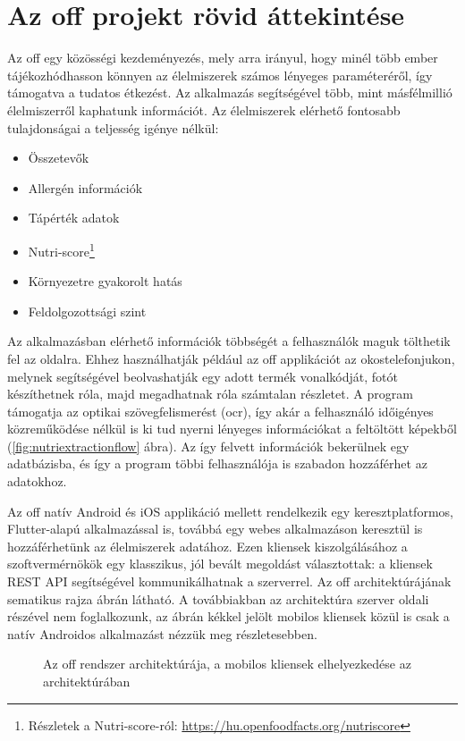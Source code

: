\chapter{Az \acrlong{off} projekt rövid áttekintése}

Az \acrlong{off} egy közösségi kezdeményezés, mely arra irányul, hogy minél több ember
tájékozhódhasson könnyen az élelmiszerek számos lényeges paraméteréről, így támogatva a
tudatos étkezést. Az alkalmazás segítségével több, mint másfélmillió élelmiszerről kaphatunk
információt. Az élelmiszerek elérhető fontosabb tulajdonságai a teljesség igénye nélkül:
\begin{itemize}
 \item Összetevők
 \item Allergén információk
 \item Tápérték adatok
 \item Nutri-score\footnote{Részletek a Nutri-score-ról: \url{https://hu.openfoodfacts.org/nutriscore}}
 \item Környezetre gyakorolt hatás
 \item Feldolgozottsági szint
\end{itemize}


Az alkalmazásban elérhető információk többségét a felhasználók maguk tölthetik fel az oldalra.
Ehhez használhatják például az \acrlong{off} applikációt az okostelefonjukon, melynek segítségével
beolvashatják egy adott termék vonalkódját, fotót készíthetnek róla, majd megadhatnak róla számtalan
részletet. A program támogatja az optikai szövegfelismerést (\acrfull{ocr}),
így akár a felhasználó időigényes közreműködése nélkül is ki tud nyerni lényeges információkat a
feltöltött képekből (\ref{fig:nutriextractionflow} ábra). Az így felvett információk bekerülnek egy adatbázisba, és így a program többi
felhasználója is szabadon hozzáférhet az adatokhoz.

Az \acrlong{off} natív Android és iOS applikáció mellett rendelkezik egy keresztplatformos,
Flutter-alapú alkalmazással is, továbbá egy webes alkalmazáson keresztül is hozzáférhetünk az
élelmiszerek adatához. Ezen kliensek kiszolgálásához a szoftvermérnökök egy klasszikus,
jól bevált megoldást választottak: a kliensek REST API segítségével kommunikálhatnak a %
szerverrel. Az \acrlong{off} architektúrájának sematikus rajza \az{\ref{fig:offarchitektura}}
ábrán látható. A továbbiakban az architektúra szerver oldali részével nem foglalkozunk, az
ábrán kékkel jelölt mobilos kliensek közül is csak a natív Androidos alkalmazást nézzük meg részletesebben.

\begin{figure}[h]
\centering

\caption{\centering Az \acrlong{off} rendszer architektúrája, a mobilos kliensek elhelyezkedése az architektúrában}
\label{fig:offarchitektura}
\end{figure}
